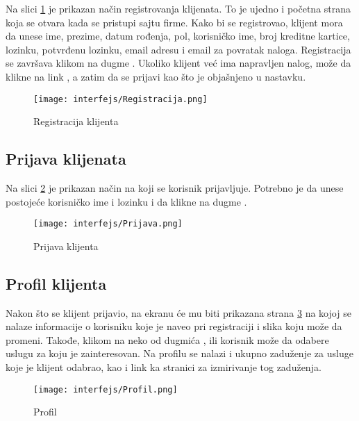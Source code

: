 \documentclass[a4paper]{article}
\begin{document}
Na slici \ref{fig:ki_reg} je prikazan način registrovanja klijenata. To je ujedno i početna strana koja se otvara kada se pristupi sajtu firme. Kako bi se registrovao, klijent mora da unese ime, prezime, datum rođenja, pol, korisničko ime, broj kreditne kartice, lozinku, potvrđenu lozinku, email adresu i email za povratak naloga. Registracija se završava klikom na dugme . Ukoliko klijent već ima napravljen nalog, može da klikne na link , a zatim da se prijavi kao što je objašnjeno u nastavku.

\begin{figure}[H]
    \centering
    \texttt{[image: interfejs/Registracija.png]}
    \caption{Registracija klijenta}
    \label{fig:ki_reg}
\end{figure}

\subsection{Prijava klijenata}

Na slici \ref{fig:ki_prijava} je prikazan način na koji se korisnik prijavljuje. Potrebno je da unese postojeće korisničko ime i lozinku i da klikne na dugme .

\begin{figure}[H]
    \centering
    \texttt{[image: interfejs/Prijava.png]}
    \caption{Prijava klijenta}
    \label{fig:ki_prijava}
\end{figure}

\subsection{Profil klijenta}

Nakon što se klijent prijavio, na ekranu će mu biti prikazana strana \ref{fig:ki_profil} na kojoj se nalaze informacije o korisniku koje je naveo pri registraciji i slika koju može da promeni. Takođe, klikom na neko od dugmića ,   ili  korisnik može da odabere uslugu za koju je zainteresovan. Na profilu se nalazi i ukupno zaduženje za usluge koje je klijent odabrao, kao i link  ka stranici za izmirivanje tog zaduženja.


\begin{figure}[H]
    \centering
    \texttt{[image: interfejs/Profil.png]}
    \caption{Profil}
    \label{fig:ki_profil}
\end{figure}
\end{document}
